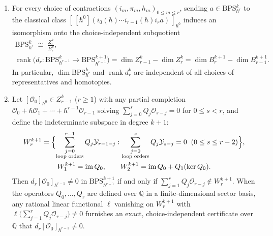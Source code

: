 \documentclass[11pt]{article}
\numberwithin{equation}{section}
\numberwithin{figure}{section}
\numberwithin{table}{section}
\begin{document}
\begin{enumerate}
\item For every choice of contractions $(i_m,\pi_m,h_m)_{0\le m\le r}$, sending $a\in\mathrm{BPS}_{\hbar^r}^k$ to the classical class $[\,[\hbar^0](i_0(\hbar)\cdots i_{r-1}(\hbar)i_ra)\,]_{\hbar^0}$ induces an isomorphism onto the choice-independent subquotient
\begin{equation}\label{eq-ch9-canonical-subquotient}
\begin{gathered}
\mathrm{BPS}_{\hbar^r}^k\;\cong\;\frac{Z_r^k}{B_r^k},\\
\operatorname{rank}\bigl(d_r:\mathrm{BPS}_{\hbar^{r-1}}^k\to\mathrm{BPS}_{\hbar^{r-1}}^{k+1}\bigr)
=\dim Z_{r-1}^k-\dim Z_r^k=\dim B_r^{k+1}-\dim B_{r-1}^{k+1}.
\end{gathered}
\end{equation}
In particular, $\dim\mathrm{BPS}_{\hbar^r}^k$ and $\operatorname{rank}d_r^k$ are independent of all choices of representatives and homotopies.
\item Let $[\mathcal O_0]_{\hbar^0}\in Z_{r-1}^k$ ($r\ge1$) with any partial completion $\mathcal O_0+\hbar\mathcal O_1+\cdots+\hbar^{r-1}\mathcal O_{r-1}$ solving $\sum_{j=0}^s Q_j\mathcal O_{s-j}=0$ for $0\le s<r$, and define the indeterminate subspace in degree $k+1$:
\begin{equation}\label{eq-ch9-indeterminate-subspace}
\begin{gathered}
W_r^{k+1}=\Bigl\{\sum_{\substack{j=0\\\text{loop orders}}}^{r-1}Q_j\mathcal Y_{r-1-j}:
\sum_{\substack{j=0\\\text{loop orders}}}^{s}Q_j\mathcal Y_{s-j}=0\;\;(0\le s\le r-2)\Bigr\},\\
W_1^{k+1}=\operatorname{im}Q_0,\qquad
W_2^{k+1}=\operatorname{im}Q_0+Q_1(\ker Q_0).
\end{gathered}
\end{equation}
Then $d_r[\mathcal O_0]_{\hbar^{r-1}}\ne0$ in $\mathrm{BPS}_{\hbar^{r-1}}^{k+1}$ if and only if $\sum_{j=1}^r Q_j\mathcal O_{r-j}\notin W_r^{k+1}$. When the operators $Q_0,\ldots,Q_r$ are defined over $\mathbb Q$ in a finite-dimensional sector basis, any rational linear functional $\ell$ vanishing on $W_r^{k+1}$ with $\ell\bigl(\sum_{j=1}^r Q_j\mathcal O_{r-j}\bigr)\ne0$ furnishes an exact, choice-independent certificate over $\mathbb Q$ that $d_r[\mathcal O_0]_{\hbar^{r-1}}\ne0$.
\end{enumerate}
\end{document}
